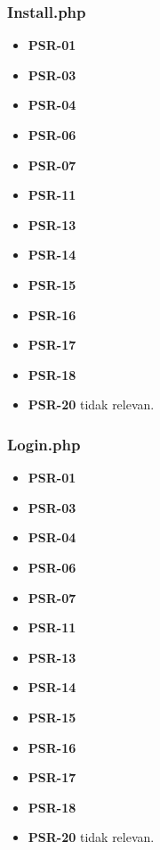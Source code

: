 \subsubsection{Install.php}
\begin{itemize}
	\item \textbf{PSR-01} 
	\item \textbf{PSR-03}
	\item \textbf{PSR-04}
	\item \textbf{PSR-06}
	\item \textbf{PSR-07}
	\item \textbf{PSR-11}
	\item \textbf{PSR-13}
	\item \textbf{PSR-14}
	\item \textbf{PSR-15}
	\item \textbf{PSR-16}
	\item \textbf{PSR-17} 
	\item \textbf{PSR-18} 
	\item \textbf{PSR-20} tidak relevan.
\end{itemize}

\subsubsection{Login.php}
\begin{itemize}
	\item \textbf{PSR-01} 
	\item \textbf{PSR-03}
	\item \textbf{PSR-04}
	\item \textbf{PSR-06}
	\item \textbf{PSR-07}
	\item \textbf{PSR-11}
	\item \textbf{PSR-13}
	\item \textbf{PSR-14}
	\item \textbf{PSR-15}
	\item \textbf{PSR-16}
	\item \textbf{PSR-17} 
	\item \textbf{PSR-18} 
	\item \textbf{PSR-20} tidak relevan.
\end{itemize}

